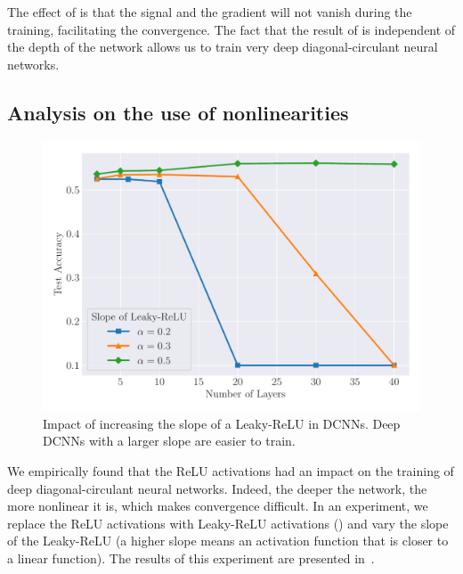 The effect of  is that the signal and the gradient will not vanish during the training, facilitating the convergence.
The fact that the result of  is independent of the depth of the network allows us to train very deep diagonal-circulant neural networks.



\subsection{Analysis on the use of nonlinearities}
\label{subsection:ch4-analysis_on_the_use_of_nonlinearities}

\begin{figure}[htb]
  \centering
  \includegraphics[width=\scalefigure\textwidth]{figures/main/ch4-diagonal_circulant/cifar10_leaky_relu.pdf}
  \caption{
    Impact of increasing the slope of a Leaky-ReLU in DCNNs.
    Deep DCNNs with a larger slope are easier to train.}
  \label{figure:ch4-cifar10_leaky_relu}
\end{figure}


We empirically found that the ReLU activations had an impact on the training of deep diagonal-circulant neural networks.
Indeed, the deeper the network, the more nonlinear it is, which makes convergence difficult.
In an experiment, we replace the ReLU activations with Leaky-ReLU activations (\cf {}) and vary the slope of the Leaky-ReLU (a higher slope means an activation function that is closer to a linear function).
The results of this experiment are presented in~.

